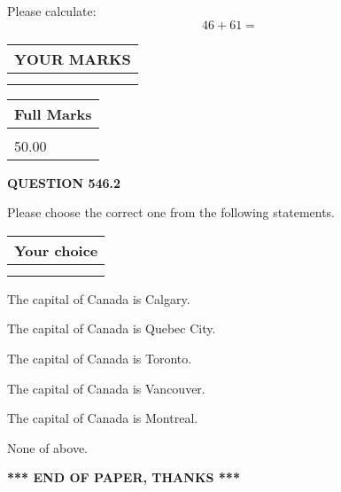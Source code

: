 \documentclass[12pt]{article}
\begin{document}
  
 
Please calculate:
\begin{equation}
46 +  %
61 = \nonumber
\end{equation}
 

 

 
  
\vspace{0.2in}
  
\noindent\begin{tabular}{|l|}
\hline
 YOUR MARKS  \\
\hline
 \\ 
 \\ 
\hline
\end{tabular}
\hspace{0.05in} \begin{tabular}{|l|}
\hline
 Full Marks  \\
\hline
 \\ 
50.00 \\
\hline
\end{tabular}
{\textbf{\Large{QUESTION
546.2 
}}}
  
  
Please choose the correct one from the following statements.
  
  
\noindent\hspace{3.0in} \begin{tabular}{|l|}
\hline
Your choice \\
\hline
 \\ 
 \\ 
\hline
\end{tabular}
  
  
 
 
The capital of Canada is Calgary.
 
 
The capital of Canada is Quebec City.
 
 
The capital of Canada is Toronto.
 
 
The capital of Canada is Vancouver.
 
 
The capital of Canada is Montreal.
 
 
 None of above.
 
 
   
   
 \vspace{0.2in}
 
   
   
   
   
\vspace{1.0in} 
{\textbf{\large{ *** END OF PAPER, THANKS *** }}} 
   
\end{document}
